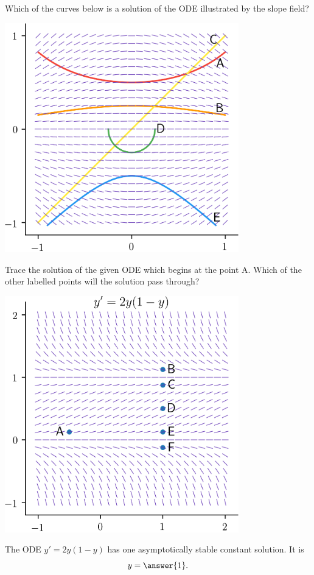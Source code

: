 \documentclass{ximera}
\begin{document}
\begin{exercise}
Which of the curves below is a solution of the ODE illustrated by the slope field?
\begin{center}\begin{image}
\includegraphics[width=4in]{images/slope02.png}
\end{image}\end{center}
\begin{multipleChoice}
\end{multipleChoice}
\end{exercise}

\begin{exercise}
Trace the solution of the given ODE which begins at the point A. Which of the other labelled points will the solution pass through?
\begin{center}\begin{image}
\includegraphics[width=4in]{images/connect01.png}
\end{image}\end{center}
\begin{multipleChoice}
\end{multipleChoice}
The ODE $y' = 2y (1-y)$ has one asymptotically stable constant solution. It is 
\[ y = \answer{1}. \]
\end{exercise}
\end{document}
